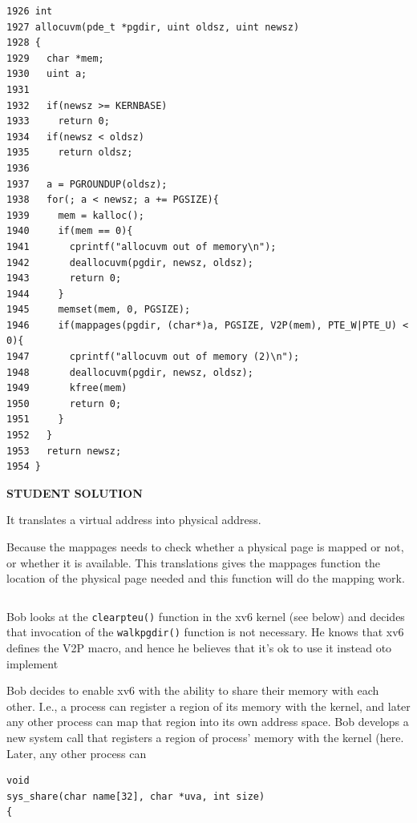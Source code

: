 \documentclass[11pt]{exam}
\begin{document}
\begin{questions}
\begin{parts}
\begin{verbatim}
1926 int
1927 allocuvm(pde_t *pgdir, uint oldsz, uint newsz)
1928 {
1929   char *mem;
1930   uint a;
1931 
1932   if(newsz >= KERNBASE)
1933     return 0;
1934   if(newsz < oldsz)
1935     return oldsz;
1936 
1937   a = PGROUNDUP(oldsz);
1938   for(; a < newsz; a += PGSIZE){
1939     mem = kalloc();
1940     if(mem == 0){
1941       cprintf("allocuvm out of memory\n");
1942       deallocuvm(pgdir, newsz, oldsz);
1943       return 0;
1944     }
1945     memset(mem, 0, PGSIZE);
1946     if(mappages(pgdir, (char*)a, PGSIZE, V2P(mem), PTE_W|PTE_U) < 0){
1947       cprintf("allocuvm out of memory (2)\n");
1948       deallocuvm(pgdir, newsz, oldsz);
1949       kfree(mem)
1950       return 0;
1951     }
1952   }
1953   return newsz; 
1954 }

\end{verbatim}

\textbf{STUDENT SOLUTION } 
\begin{adjustwidth}{1.5em}{1em}
It translates a virtual address into physical address.  
  
Because the mappages needs to check whether a physical page is mapped or not, or whether it is available. This translations gives the mappages function the location of the physical page needed and this function will do the mapping work.
  
\end{adjustwidth}
\vfill

\newpage

\begin{verbatim}

\end{verbatim}

\vfill


Bob looks at the \texttt{clearpteu()} function in the xv6 kernel (see below) and decides that invocation of the \texttt{walkpgdir()} function is not necessary. He knows that xv6 defines the V2P macro, and hence he believes that it's ok to use it instead oto implement 


Bob decides to enable xv6 with the ability to share their memory with each other. I.e., a process can register a region of its memory with the kernel, and later any other process can map that region into its own address space. Bob develops a new system call that registers a region of process' memory with the kernel (here. Later, any other process can 

\begin{verbatim}
void
sys_share(char name[32], char *uva, int size)
{
  

\end{verbatim}
\end{parts}
\end{questions}
\end{document}
